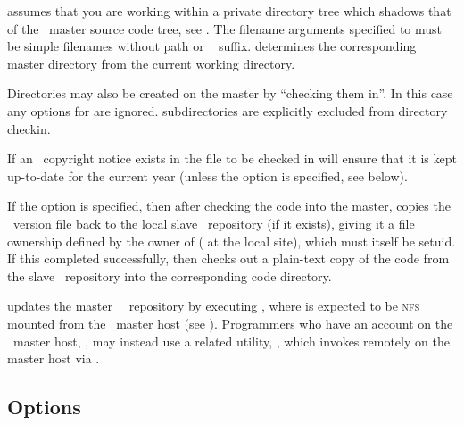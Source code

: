  assumes that you are working within a private directory tree which
shadows that of the \aipspp\ master source code tree, see .
The filename arguments specified to  must be simple filenames without
path or \rcs\  suffix.   determines the corresponding master
directory from the current working directory.

Directories may also be created on the master by ``checking them in''.  In
this case any options for  are ignored.   subdirectories
are explicitly excluded from directory checkin.

If an \aipspp\ copyright notice exists in the file to be checked in 
will ensure that it is kept up-to-date for the current year (unless the
 option is specified, see below).

If the  option is specified, then after checking the code into the
master,  copies the \rcs\ version file back to the local slave
\rcs\ repository (if it exists), giving it a file ownership defined by the
owner of  ( at the local site), which must itself be
setuid.  If this completed successfully,  then checks out a plain-text
copy of the code from the slave \rcs\ repository into the corresponding code
directory.

 updates the master \aipspp\ \rcs\ repository by executing
, where  is expected to be
\textsc{nfs} mounted from the \aipspp\ master host (see
).  Programmers who have an account on the \aipspp\ 
master host, , may instead use a related utility,
\exeref{rai}, which invokes \exe{ai} remotely on the master host via
\unixexe{rsh}.

\subsection*{Options}

